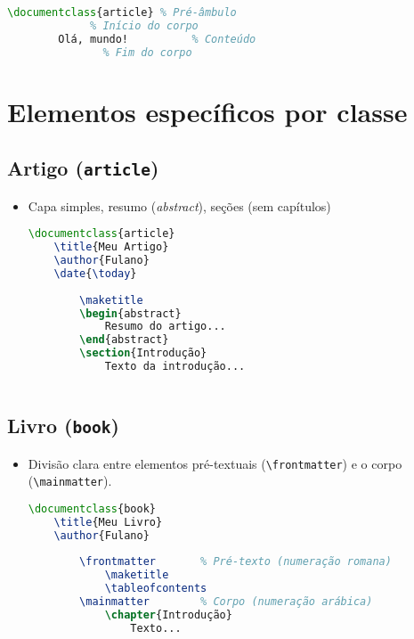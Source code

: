 \begin{lstlisting}[language=tex, caption=Exemplo de estrutura mínima]
    \documentclass{article} % Pré-âmbulo
             % Início do corpo
        Olá, mundo!          % Conteúdo
               % Fim do corpo
\end{lstlisting}

\section{Elementos específicos por classe}

\subsection{Artigo (\texttt{article})}
\begin{itemize}
    \item Capa simples, resumo (\textit{abstract}), seções (sem capítulos)
    \begin{lstlisting}[language=tex, caption=Exemplo de artigo]
    \documentclass{article}
    \title{Meu Artigo}
    \author{Fulano}
    \date{\today}
    
        \maketitle
        \begin{abstract}
            Resumo do artigo...
        \end{abstract}
        \section{Introdução}
            Texto da introdução...
    
    \end{lstlisting}
\end{itemize}

\subsection{Livro (\texttt{book})}

\begin{itemize}
    \item Divisão clara entre elementos pré-textuais (\verb|\frontmatter|) e o corpo (\verb|\mainmatter|).
    \begin{lstlisting}[language=tex, caption=Exemplo de livro]
    \documentclass{book}
    \title{Meu Livro}
    \author{Fulano}
    
        \frontmatter       % Pré-texto (numeração romana)
            \maketitle
            \tableofcontents
        \mainmatter        % Corpo (numeração arábica)
            \chapter{Introdução}
                Texto...
    
    \end{lstlisting}
\end{itemize}

